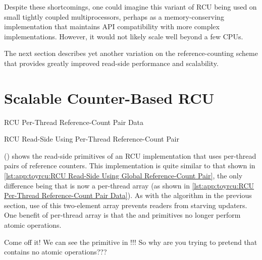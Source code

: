 Despite these shortcomings, one could imagine this variant
of RCU being used on small tightly coupled multiprocessors,
perhaps as a memory-conserving implementation that maintains
API compatibility with more complex implementations.
However, it would not likely scale well beyond a few CPUs.

The next section describes yet another variation on the reference-counting
scheme that provides greatly improved read-side performance and scalability.

\section{Scalable Counter-Based RCU}
\label{sec:app:toyrcu:Scalable Counter-Based RCU}

\begin{listing}[tb]

\caption{RCU Per-Thread Reference-Count Pair Data}
\label{lst:app:toyrcu:RCU Per-Thread Reference-Count Pair Data}
\end{listing}

\begin{listing}[tb]

\caption{RCU Read-Side Using Per-Thread Reference-Count Pair}
\label{lst:app:toyrcu:RCU Read-Side Using Per-Thread Reference-Count Pair}
\end{listing}

()
shows the read-side primitives of an RCU implementation that uses per-thread
pairs of reference counters.
This implementation is quite similar to that shown in
\cref{lst:app:toyrcu:RCU Read-Side Using Global Reference-Count Pair},
the only difference being that  is now a per-thread
array (as shown in
\cref{lst:app:toyrcu:RCU Per-Thread Reference-Count Pair Data}).
As with the algorithm in the previous section, use of this two-element
array prevents readers from starving updaters.
One benefit of per-thread  array is that the
 and  primitives no longer
perform atomic operations.

\QuickQuiz{}
	Come off it!
	We can see the  primitive in
	!!!
	So why are you trying to pretend that 
	contains no atomic operations???
 \QuickQuizEnd

